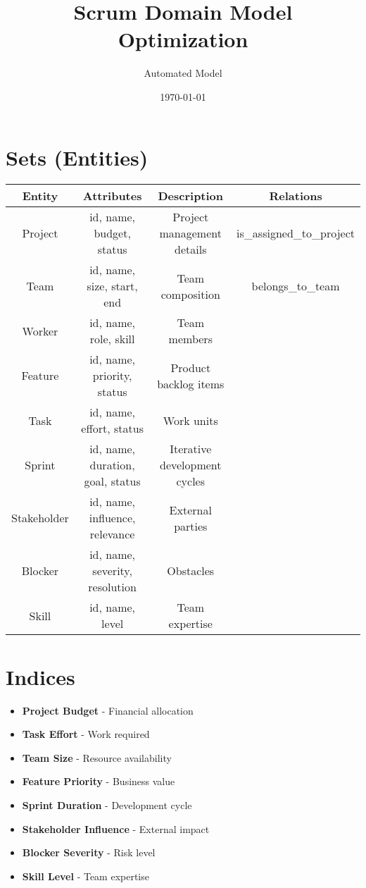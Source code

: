 \documentclass{article}
\title{Scrum Domain Model Optimization}
\author{Automated Model}
\date{\today}
\begin{document}
\maketitle

\section{Sets (Entities)}
\begin{tabular}{|c|c|c|c|}
\hline
\textbf{Entity} & \textbf{Attributes} & \textbf{Description} & \textbf{Relations} \\
\hline
Project & id, name, budget, status & Project management details & is\_assigned\_to\_project \\
\hline
Team & id, name, size, start, end & Team composition & belongs\_to\_team \\
\hline
Worker & id, name, role, skill & Team members & \\
\hline
Feature & id, name, priority, status & Product backlog items & \\
\hline
Task & id, name, effort, status & Work units & \\
\hline
Sprint & id, name, duration, goal, status & Iterative development cycles & \\
\hline
Stakeholder & id, name, influence, relevance & External parties & \\
\hline
Blocker & id, name, severity, resolution & Obstacles & \\
\hline
Skill & id, name, level & Team expertise & \\
\hline
\end{tabular}

\section{Indices}
\begin{itemize}
    \item \textbf{Project Budget} - Financial allocation
    \item \textbf{Task Effort} - Work required
    \item \textbf{Team Size} - Resource availability
    \item \textbf{Feature Priority} - Business value
    \item \textbf{Sprint Duration} - Development cycle
    \item \textbf{Stakeholder Influence} - External impact
    \item \textbf{Blocker Severity} - Risk level
    \item \textbf{Skill Level} - Team expertise
\end{itemize}
\end{document}
